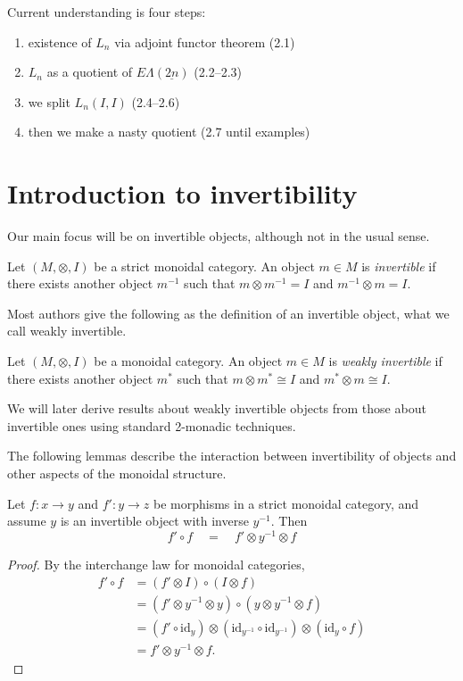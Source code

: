 \documentclass{amsbook} %
\newcommand{\id}{\textrm{id}}
\newcommand{\ELnn}{E\Lambda(\underline{2n})}
\numberwithin{section}{chapter}
\begin{document}
Current understanding is four steps:
\begin{enumerate}
\item existence of $L_n$ via adjoint functor theorem (2.1)
\item $L_n$ as a quotient of $\ELnn$ (2.2--2.3)
\item we split $L_n(I,I)$ (2.4--2.6)
\item then we make a nasty quotient (2.7 until examples)
\end{enumerate}

\section{Introduction to invertibility}

Our main focus will be on invertible objects, although not in the usual sense.
\begin{Defi}
Let $(M, \otimes, I)$ be a strict monoidal category. An object $m \in M$ is \emph{invertible} if there exists another object $m^{-1}$ such that $m \otimes m^{-1} = I$ and $m^{-1} \otimes m = I$.

\end{Defi}

Most authors give the following as the definition of an invertible object, what we call weakly invertible.
\begin{Defi}
Let $(M, \otimes, I)$ be a monoidal category. An object $m \in M$ is \emph{weakly invertible} if there exists another object $m^{*}$ such that $m \otimes m^{*} \cong I$ and $m^{*} \otimes m \cong I$.

\end{Defi}
We will later derive results about weakly invertible objects from those about invertible ones using standard 2-monadic techniques.

The following lemmas describe the interaction between invertibility of objects and other aspects of the monoidal structure.

\begin{lem} \label{tenscomp} Let $f \colon  x \rightarrow y$ and $f' \colon  y \rightarrow z$ be morphisms in a strict monoidal category, and assume $y$ is an invertible object with inverse $y^{-1}$. Then
  \[
    f' \circ f \quad = \quad f' \otimes y^{-1} \otimes f
  \]
\end{lem}
\begin{proof}
By the interchange law for monoidal categories,
\begin{align*}
			f' \circ f &= (f' \otimes I) \circ (I \otimes f) \\
			&= \left(f' \otimes y^{-1} \otimes y\right) \circ \left(y \otimes y^{-1} \otimes f\right) \\
			&= \left(f' \circ \id_{y}\right) \otimes \left(\id_{y^{-1}} \circ \id_{y^{-1}}\right) \otimes (\id_y \circ f) \\
			&= f' \otimes y^{-1} \otimes f .
		\end{align*}
\end{proof} 
\end{document}
